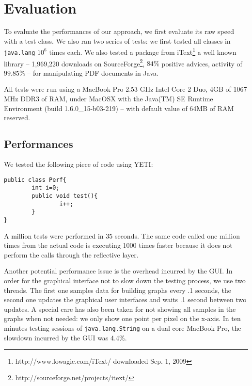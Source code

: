 \section{Evaluation}\label{sec:evaluation}

To evaluate the performances of our approach, we first evaluate its  raw speed with a test class. We also ran two series of tests: we first tested all classes in \texttt{java.lang} $10^{6}$ times each. We also tested a package from iText\footnote{http://www.lowagie.com/iText/ downloaded Sep. 1, 2009} a well known library -- 1,969,220 downloads on SourceForge\footnote{http://sourceforge.net/projects/itext/}, $84\%$ positive advices, activity of $99.85\%$ -- for manipulating PDF documents in Java. 

All tests were run using a MacBook Pro 2.53 GHz Intel Core 2 Duo, 4GB of 1067 MHz DDR3 of RAM, under MacOSX with the Java(TM) SE Runtime Environment (build 1.6.0\_15-b03-219) -- with default value of 64MB of RAM reserved. 

\subsection{Performances}

We tested the following piece of code using YETI:
\begin{verbatim}
public class Perf{
        int i=0;
        public void test(){
                i++;
        }
}
\end{verbatim}

A million tests were performed in 35 seconds. The same code called one million times from the actual code is executing 1000 times faster because it does not perform the calls through the reflective layer.

Another potential performance issue is the overhead incurred by the GUI.
In order for the graphical interface not to slow down the testing process, we use two threads.
The first one samples data for building graphs every .1 seconds, the second one updates the graphical user interfaces and waits .1 second between two updates. A special care has also been taken for not showing all samples in the graphs when not needed: we only show one point per pixel on the x-axis. In ten minutes testing sessions  of \texttt{java.lang.String} on a dual core MacBook Pro, the slowdown incurred by the GUI was $4.4\%$. 



